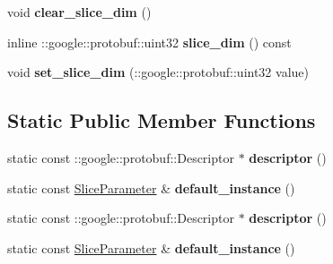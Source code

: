 \begin{DoxyCompactItemize}
\mbox{\label{classcaffe_1_1_slice_parameter_a8d83e0a651a4b7cfca41b3abd7e2de11}} 
void {\bfseries clear\+\_\+slice\+\_\+dim} ()
\item 
\mbox{\label{classcaffe_1_1_slice_parameter_a9160dd372fd0fe7b194397606fd2dfcb}} 
inline \+::google\+::protobuf\+::uint32 {\bfseries slice\+\_\+dim} () const
\item 
\mbox{\label{classcaffe_1_1_slice_parameter_a0b4afa8bd902e2937634d390cf25e981}} 
void {\bfseries set\+\_\+slice\+\_\+dim} (\+::google\+::protobuf\+::uint32 value)
\end{DoxyCompactItemize}
\subsection*{Static Public Member Functions}
\begin{DoxyCompactItemize}
\item 
\mbox{\label{classcaffe_1_1_slice_parameter_ade4586a64e58d6ab4a8c213eab7c53a3}} 
static const \+::google\+::protobuf\+::\+Descriptor $\ast$ {\bfseries descriptor} ()
\item 
\mbox{\label{classcaffe_1_1_slice_parameter_ab686de2ab0ba155a6b15e5d8de85b350}} 
static const \mbox{\hyperlink{classcaffe_1_1_slice_parameter}{Slice\+Parameter}} \& {\bfseries default\+\_\+instance} ()
\item 
\mbox{\label{classcaffe_1_1_slice_parameter_ab57229a706f27dc5ced64a663358e094}} 
static const \+::google\+::protobuf\+::\+Descriptor $\ast$ {\bfseries descriptor} ()
\item 
\mbox{\label{classcaffe_1_1_slice_parameter_af1b4e3dff4e943154abaf5c24e8f8fd1}} 
static const \mbox{\hyperlink{classcaffe_1_1_slice_parameter}{Slice\+Parameter}} \& {\bfseries default\+\_\+instance} ()
\end{DoxyCompactItemize}
